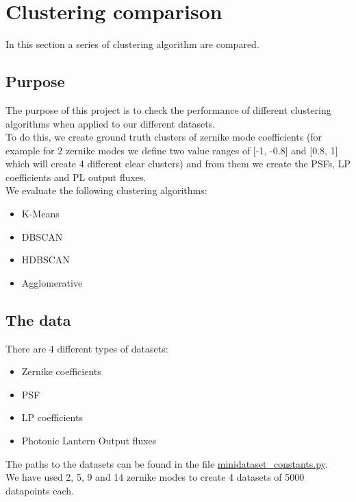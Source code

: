 \section{Clustering comparison}
	
	In this section a series of clustering algorithm are compared.
	

	\subsection{Purpose}
	
		The purpose of this project is to check the performance of different clustering algorithms when applied to our different datasets.\\
		
		To do this, we create ground truth clusters of zernike mode coefficients (for example for 2 zernike modes we define two value ranges of [-1, -0.8] and [0.8, 1] which will create 4 different clear clusters) and from them we create the PSFs, LP coefficients and PL output fluxes.\\
		
		We evaluate the following clustering algorithms:
		\begin{itemize}
			\item K-Means
			\item DBSCAN
			\item HDBSCAN
			\item Agglomerative
		\end{itemize}
	

	\subsection{The data}
	
		There are 4 different types of datasets:
		\begin{itemize}
			\item Zernike coefficients
			\item PSF
			\item LP coefficients
			\item Photonic Lantern Output fluxes
		\end{itemize}
		
		The paths to the datasets can be found in the file \href{https://github.com/Dacarpe03/PLImageReconstruction/blob/main/Utils/minidataset_constants.py}{minidataset\_constants.py}.\\
		
		We have used 2, 5, 9 and 14 zernike modes to create 4 datasets of 5000 datapoints each.
		

